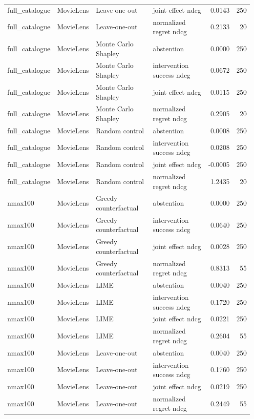 \begin{longtable}{@{}p{}p{}p{}p{}rr@{}}
full\_catalogue & MovieLens & Leave-one-out & joint effect ndcg & 0.0143 & 250 \\
full\_catalogue & MovieLens & Leave-one-out & normalized regret ndcg & 0.2133 & 20 \\
full\_catalogue & MovieLens & Monte Carlo Shapley & abstention & 0.0000 & 250 \\
full\_catalogue & MovieLens & Monte Carlo Shapley & intervention success ndcg & 0.0672 & 250 \\
full\_catalogue & MovieLens & Monte Carlo Shapley & joint effect ndcg & 0.0115 & 250 \\
full\_catalogue & MovieLens & Monte Carlo Shapley & normalized regret ndcg & 0.2905 & 20 \\
full\_catalogue & MovieLens & Random control & abstention & 0.0008 & 250 \\
full\_catalogue & MovieLens & Random control & intervention success ndcg & 0.0208 & 250 \\
full\_catalogue & MovieLens & Random control & joint effect ndcg & -0.0005 & 250 \\
full\_catalogue & MovieLens & Random control & normalized regret ndcg & 1.2435 & 20 \\
nmax100 & MovieLens & Greedy counterfactual & abstention & 0.0000 & 250 \\
nmax100 & MovieLens & Greedy counterfactual & intervention success ndcg & 0.0640 & 250 \\
nmax100 & MovieLens & Greedy counterfactual & joint effect ndcg & 0.0028 & 250 \\
nmax100 & MovieLens & Greedy counterfactual & normalized regret ndcg & 0.8313 & 55 \\
nmax100 & MovieLens & LIME & abstention & 0.0040 & 250 \\
nmax100 & MovieLens & LIME & intervention success ndcg & 0.1720 & 250 \\
nmax100 & MovieLens & LIME & joint effect ndcg & 0.0221 & 250 \\
nmax100 & MovieLens & LIME & normalized regret ndcg & 0.2604 & 55 \\
nmax100 & MovieLens & Leave-one-out & abstention & 0.0040 & 250 \\
nmax100 & MovieLens & Leave-one-out & intervention success ndcg & 0.1760 & 250 \\
nmax100 & MovieLens & Leave-one-out & joint effect ndcg & 0.0219 & 250 \\
nmax100 & MovieLens & Leave-one-out & normalized regret ndcg & 0.2449 & 55 \\

\end{longtable}
